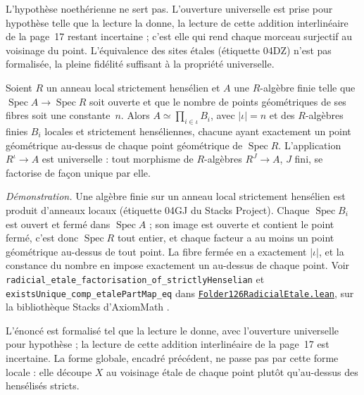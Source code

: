{L'hypothèse noethérienne ne sert pas. L'ouverture universelle est prise pour hypothèse telle que la lecture la donne, la lecture de cette addition interlinéaire de la page~17 restant incertaine ; c'est elle qui rend chaque morceau surjectif au voisinage du point. L'équivalence des sites étales (étiquette 04DZ) n'est pas formalisée, la pleine fidélité suffisant à la propriété universelle.\par}

\begin{encadre}
\begin{theoreme*}
Soient $R$ un anneau local strictement hensélien et $A$ une $R$-algèbre finie telle que $\operatorname{Spec} A \to \operatorname{Spec} R$ soit ouverte et que le nombre de points géométriques de ses fibres soit une constante~$n$. Alors $A \simeq \prod_{i \in \iota} B_i$, avec $|\iota| = n$ et des $R$-algèbres finies $B_i$ locales et strictement henséliennes, chacune ayant exactement un point géométrique au-dessus de chaque point géométrique de $\operatorname{Spec} R$. L'application $R^\iota \to A$ est universelle : tout morphisme de $R$-algèbres $R^J \to A$, $J$ fini, se factorise de façon unique par elle.
\end{theoreme*}
\end{encadre}
{\small \emph{Démonstration.} Une algèbre finie sur un anneau local strictement hensélien est produit d'anneaux locaux (étiquette 04GJ du Stacks Project). Chaque $\operatorname{Spec} B_i$ est ouvert et fermé dans $\operatorname{Spec} A$ ; son image est ouverte et contient le point fermé, c'est donc $\operatorname{Spec} R$ tout entier, et chaque facteur a au moins un point géométrique au-dessus de tout point. La fibre fermée en a exactement $|\iota|$, et la constance du nombre en impose exactement un au-dessus de chaque point. Voir \texttt{radicial\_etale\_factorisation\_of\_strictlyHenselian} et \texttt{existsUnique\_comp\_etalePartMap\_eq} dans \href{\leanblobmain/AlgebraicGeometry/Folder126RadicialEtale.lean}{\texttt{Folder126RadicialEtale.\allowbreak{}lean}}, sur la bibliothèque Stacks d'AxiomMath \cite{axiomstacks}.

L'énoncé est formalisé tel que la lecture le donne, avec l'ouverture universelle pour hypothèse ; la lecture de cette addition interlinéaire de la page~17 est incertaine. La forme globale, encadré précédent, ne passe pas par cette forme locale : elle découpe $X$ au voisinage étale de chaque point plutôt qu'au-dessus des hensélisés stricts.\par}

